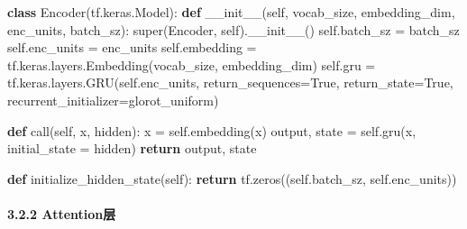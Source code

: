 \documentclass[
]{article}
\newenvironment{Shaded}{}{}
\newcommand{\BuiltInTok}[1]{#1}
\newcommand{\ControlFlowTok}[1]{\textcolor[rgb]{0.00,0.44,0.13}{\textbf{#1}}}
\newcommand{\FunctionTok}[1]{\textcolor[rgb]{0.02,0.16,0.49}{#1}}
\newcommand{\KeywordTok}[1]{\textcolor[rgb]{0.00,0.44,0.13}{\textbf{#1}}}
\newcommand{\NormalTok}[1]{#1}
\newcommand{\OperatorTok}[1]{\textcolor[rgb]{0.40,0.40,0.40}{#1}}
\newcommand{\StringTok}[1]{\textcolor[rgb]{0.25,0.44,0.63}{#1}}
\newcommand{\VariableTok}[1]{\textcolor[rgb]{0.10,0.09,0.49}{#1}}
\begin{document}
\begin{Shaded}
\begin{Highlighting}[]
\KeywordTok{class}\NormalTok{ Encoder(tf.keras.Model):}
    \KeywordTok{def} \FunctionTok{\_\_init\_\_}\NormalTok{(}\VariableTok{self}\NormalTok{, vocab\_size, embedding\_dim, enc\_units, batch\_sz):}
        \BuiltInTok{super}\NormalTok{(Encoder, }\VariableTok{self}\NormalTok{).}\FunctionTok{\_\_init\_\_}\NormalTok{()}
        \VariableTok{self}\NormalTok{.batch\_sz }\OperatorTok{=}\NormalTok{ batch\_sz}
        \VariableTok{self}\NormalTok{.enc\_units }\OperatorTok{=}\NormalTok{ enc\_units}
        \VariableTok{self}\NormalTok{.embedding }\OperatorTok{=}\NormalTok{ tf.keras.layers.Embedding(vocab\_size, embedding\_dim)}
        \VariableTok{self}\NormalTok{.gru }\OperatorTok{=}\NormalTok{ tf.keras.layers.GRU(}\VariableTok{self}\NormalTok{.enc\_units,}
\NormalTok{                                       return\_sequences}\OperatorTok{=}\VariableTok{True}\NormalTok{,}
\NormalTok{                                       return\_state}\OperatorTok{=}\VariableTok{True}\NormalTok{,}
\NormalTok{                                       recurrent\_initializer}\OperatorTok{=}\StringTok{\textquotesingle{}glorot\_uniform\textquotesingle{}}\NormalTok{)}

    \KeywordTok{def}\NormalTok{ call(}\VariableTok{self}\NormalTok{, x, hidden):}
\NormalTok{        x }\OperatorTok{=} \VariableTok{self}\NormalTok{.embedding(x)}
\NormalTok{        output, state }\OperatorTok{=} \VariableTok{self}\NormalTok{.gru(x, initial\_state }\OperatorTok{=}\NormalTok{ hidden)}
        \ControlFlowTok{return}\NormalTok{ output, state}

    \KeywordTok{def}\NormalTok{ initialize\_hidden\_state(}\VariableTok{self}\NormalTok{):}
        \ControlFlowTok{return}\NormalTok{ tf.zeros((}\VariableTok{self}\NormalTok{.batch\_sz, }\VariableTok{self}\NormalTok{.enc\_units))}
\end{Highlighting}
\end{Shaded}

\hypertarget{header-n125}{%
\paragraph{3.2.2 Attention层}\label{header-n125}}
\end{document}
